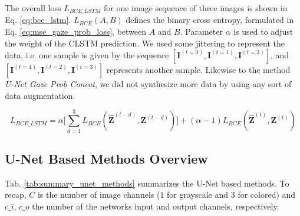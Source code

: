 The overall loss $L_{BCE\_LSTM}$ for one image sequence of three images is shown in Eq. \ref{eq:bce_lstm}. $L_{BCE}(A,B)$ defines the binary cross entropy, formulated in Eq. \ref{eq:mse_gaze_prob_loss}, between $A$ and $B$. Parameter $\alpha$ is used to adjust the weight of the CLSTM prediction. We used some jittering to represent the data, i.e. one sample is given by the sequence $[\boldsymbol{I}^{(t=0)}, \boldsymbol{I}^{(t=1)}, \boldsymbol{I}^{(t=2)}]$, and $[\boldsymbol{I}^{(t=1)}, \boldsymbol{I}^{(t=2)}, \boldsymbol{I}^{(t=3)}]$ represents another sample. Likewise to the method \textit{U-Net Gaze Prob Concat}, we did not synthesize more data by using any sort of data augmentation.

\begin{equation}
L_{BCE\_LSTM} = \alpha \Big[\sum_{d=1}^3 L_{BCE}(\boldsymbol{\hat{Z}}^{(t-d)}, \boldsymbol{Z}^{(t-d)})\Big] + (\alpha - 1) L_{BCE}(\boldsymbol{\hat{Z}}^{(t)}, \boldsymbol{Z}^{(t)})
\label{eq:bce_lstm}
\end{equation}
\hspace{6pt}

\clearpage
\subsection{U-Net Based Methods Overview}
Tab. \ref{tab:summary_unet_methods} summarizes the U-Net based methods. To recap, $C$ is the number of image channels ($1$ for grayscale and $3$ for colored) and $c\_i$, $c\_o$ the number of the networks input and output channels, respectively.

